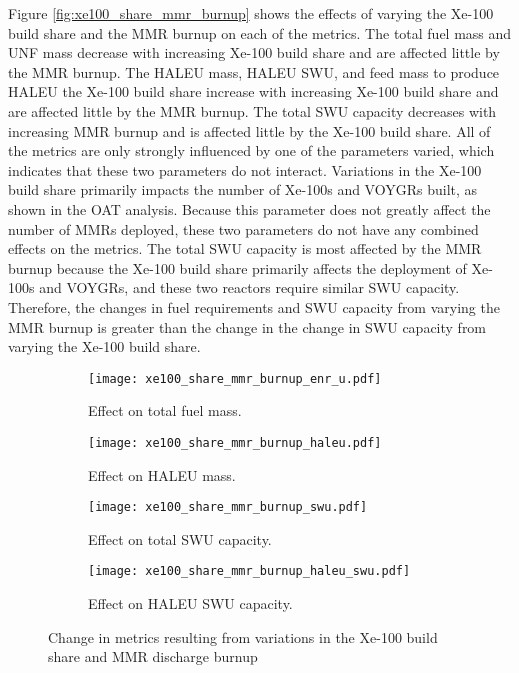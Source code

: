 Figure \ref{fig:xe100_share_mmr_burnup} shows the effects of varying the 
Xe-100 build share and the \gls{MMR} burnup on each of the metrics. 
The total fuel mass and \gls{UNF} mass decrease with increasing 
Xe-100 build share and are affected little by the \gls{MMR} burnup. The
\gls{HALEU} mass, \gls{HALEU} \gls{SWU}, and feed mass to produce 
\gls{HALEU} the Xe-100 build share  increase with increasing Xe-100 
build share and are affected little by the \gls{MMR} burnup. The total 
\gls{SWU} capacity decreases with increasing \gls{MMR} burnup and is 
affected little by the Xe-100 build share. All of the metrics are only 
strongly influenced by one of the parameters varied, which indicates that 
these two parameters do not interact. Variations in the Xe-100 build 
share primarily impacts the number of Xe-100s and VOYGRs built, as shown 
in the \gls{OAT} analysis. Because this parameter does not greatly affect 
the number of \glspl{MMR} deployed, these two parameters do not have any 
combined effects on the metrics. The total \gls{SWU} capacity is most affected 
by the \gls{MMR} burnup because the Xe-100 build share primarily 
affects the deployment of Xe-100s and VOYGRs, and these two reactors 
require similar \gls{SWU} capacity. Therefore, the changes in fuel 
requirements and \gls{SWU} capacity from varying the \gls{MMR} burnup 
is greater than the change in the change in \gls{SWU} capacity from 
varying the Xe-100 build share. 
\begin{figure}
    \begin{subfigure}[h!]{0.48\textwidth}
        \centering
        \texttt{[image: xe100\_share\_mmr\_burnup\_enr\_u.pdf]}
        \caption{Effect on total fuel mass.}
        \label{fig:xe100_share_mmr_burnup_enr_u}
    \end{subfigure}
    \hfill
    \begin{subfigure}[h!]{0.48\textwidth}
        \centering
        \texttt{[image: xe100\_share\_mmr\_burnup\_haleu.pdf]}
        \caption{Effect on HALEU mass.}
        \label{fig:xe100_share_mmr_burnup_haleu}
    \end{subfigure}
    
    \begin{subfigure}[h!]{0.48\textwidth}
        \centering
        \texttt{[image: xe100\_share\_mmr\_burnup\_swu.pdf]}
        \caption{Effect on total SWU capacity.}
        \label{fig:xe100_share_mmr_burnup_swu}
    \end{subfigure}
    \hfill
    \begin{subfigure}[h!]{0.48\textwidth}
        \centering
        \texttt{[image: xe100\_share\_mmr\_burnup\_haleu\_swu.pdf]}
        \caption{Effect on HALEU SWU capacity.}
        \label{fig:xe100_share_mmr_burnup_haleu_swu}
    \end{subfigure}   
    \caption{Change in metrics resulting from variations in the 
    Xe-100 build share and MMR discharge burnup} 
\end{figure}

